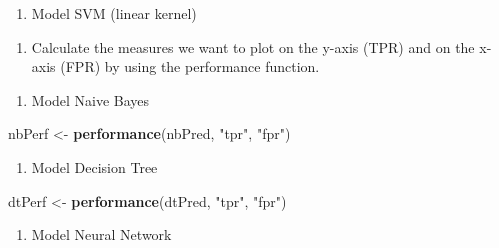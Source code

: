 \documentclass[]{article}
\newenvironment{Shaded}{\begin{snugshade}}{\end{snugshade}}
\newcommand{\KeywordTok}[1]{\textcolor[rgb]{0.13,0.29,0.53}{\textbf{#1}}}
\newcommand{\NormalTok}[1]{#1}
\newcommand{\OperatorTok}[1]{\textcolor[rgb]{0.81,0.36,0.00}{\textbf{#1}}}
\newcommand{\StringTok}[1]{\textcolor[rgb]{0.31,0.60,0.02}{#1}}
\providecommand{\tightlist}{%
  \setlength{\itemsep}{0pt}\setlength{\parskip}{0pt}}
\begin{document}
\begin{enumerate}
\def\labelenumi{\arabic{enumi}.}
\setcounter{enumi}{4}
\tightlist
\item
  Model SVM (linear kernel)
\end{enumerate}

\begin{Shaded}
\end{Shaded}

\begin{enumerate}
\def\labelenumi{\alph{enumi})}
\setcounter{enumi}{2}
\tightlist
\item
  Calculate the measures we want to plot on the y-axis (TPR) and on the
  x-axis (FPR) by using the performance function.
\end{enumerate}

\begin{enumerate}
\def\labelenumi{\arabic{enumi}.}
\tightlist
\item
  Model Naive Bayes
\end{enumerate}

\begin{Shaded}
\begin{Highlighting}[]
\NormalTok{nbPerf <-}\StringTok{ }\KeywordTok{performance}\NormalTok{(nbPred, }\StringTok{"tpr"}\NormalTok{, }\StringTok{"fpr"}\NormalTok{)}
\end{Highlighting}
\end{Shaded}

\begin{enumerate}
\def\labelenumi{\arabic{enumi}.}
\setcounter{enumi}{1}
\tightlist
\item
  Model Decision Tree
\end{enumerate}

\begin{Shaded}
\begin{Highlighting}[]
\NormalTok{dtPerf <-}\StringTok{ }\KeywordTok{performance}\NormalTok{(dtPred, }\StringTok{"tpr"}\NormalTok{, }\StringTok{"fpr"}\NormalTok{)}
\end{Highlighting}
\end{Shaded}

\begin{enumerate}
\def\labelenumi{\arabic{enumi}.}
\setcounter{enumi}{2}
\tightlist
\item
  Model Neural Network
\end{enumerate}
\end{document}

